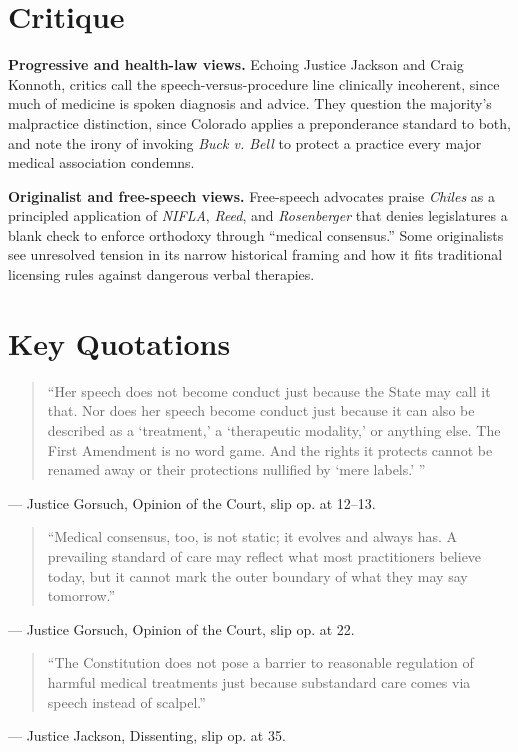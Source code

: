\documentclass[12pt]{article}
\begin{document}
\section{Critique}

\textbf{Progressive and health-law views.} Echoing Justice Jackson and Craig Konnoth, critics call the speech-versus-procedure line clinically incoherent, since much of medicine is spoken diagnosis and advice. They question the majority's malpractice distinction, since Colorado applies a preponderance standard to both, and note the irony of invoking \textit{Buck v. Bell} to protect a practice every major medical association condemns.

\textbf{Originalist and free-speech views.} Free-speech advocates praise \textit{Chiles} as a principled application of \textit{NIFLA}, \textit{Reed}, and \textit{Rosenberger} that denies legislatures a blank check to enforce orthodoxy through ``medical consensus.'' Some originalists see unresolved tension in its narrow historical framing and how it fits traditional licensing rules against dangerous verbal therapies.

\section{Key Quotations}

\begin{quote}
``Her speech does not become conduct just because the State may call it that. Nor does her speech become conduct just because it can also be described as a `treatment,' a `therapeutic modality,' or anything else. The First Amendment is no word game. And the rights it protects cannot be renamed away or their protections nullified by `mere labels.' ''
\end{quote}
\noindent --- Justice Gorsuch, Opinion of the Court, slip op. at 12--13.

\begin{quote}
``Medical consensus, too, is not static; it evolves and always has. A prevailing standard of care may reflect what most practitioners believe today, but it cannot mark the outer boundary of what they may say tomorrow.''
\end{quote}
\noindent --- Justice Gorsuch, Opinion of the Court, slip op. at 22.

\begin{quote}
``The Constitution does not pose a barrier to reasonable regulation of harmful medical treatments just because substandard care comes via speech instead of scalpel.''
\end{quote}
\noindent --- Justice Jackson, Dissenting, slip op. at 35.
\end{document}

